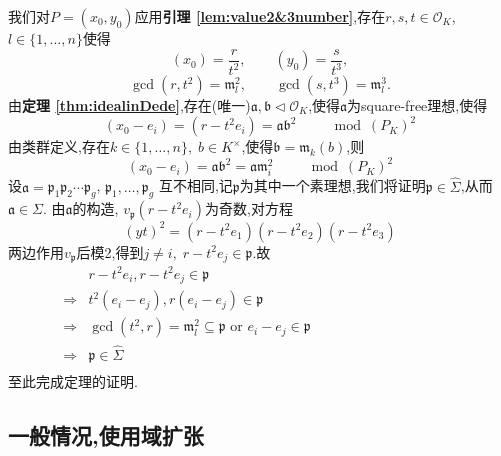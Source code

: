 \documentclass[12pt,A4paper,oneside,reqno]{amsart}
\numberwithin{equation}{section}
\theoremstyle{definition}
\theoremstyle{plain}
\theoremstyle{plain}
\numberwithin{equation}{section}
\theoremstyle{remark}
\begin{document}
我们对$P=(x_0,y_0)$应用\textbf{引理 \ref{lem:value2&3number}},存在$r,s,t \in \mathcal{O}_K$, $l \in \{1,\ldots,n\}$使得
$$(x_0)=\frac{r}{t^2}, \qquad (y_0)=\frac{s}{t^3}, $$
$$\gcd(r,t^2)=\mathfrak{m}_l^2, \qquad \gcd (s,t^3)=\mathfrak{m}_l^3.$$
由\textbf{定理 \ref{thm:idealinDede}},存在(唯一)$\mathfrak{a},\mathfrak{b} \vartriangleleft \mathcal{O}_K$,使得$\mathfrak{a}$为square-free理想,使得
$$(x_0-e_i)=(r-t^2e_i)=\mathfrak{a}\mathfrak{b}^2 \qquad \mod (P_K)^2$$
由类群定义,存在$k \in \{1,\ldots,n\},\; b \in K^{\times}$,使得$\mathfrak{b}=\mathfrak{m}_k(b)$,则
$$(x_0-e_i)=\mathfrak{a}\mathfrak{b}^2=\mathfrak{a}\mathfrak{m}_i^2 \qquad \mod (P_K)^2$$
设$\mathfrak{a}=\mathfrak{p}_1\mathfrak{p}_2\cdots \mathfrak{p}_g$, $\mathfrak{p}_1,\ldots ,\mathfrak{p}_g$ 互不相同,记$\mathfrak{p}$为其中一个素理想,我们将证明$\mathfrak{p} \in \hat{\Sigma}$,从而$\mathfrak{a} \in \Sigma$. 由$\mathfrak{a}$的构造, $v_{\mathfrak{p}}(r-t^2e_i)$为奇数,对方程
$$(yt)^2=(r-t^2e_1)(r-t^2e_2)(r-t^2e_3)$$
两边作用$v_{\mathfrak{p}}$后模2,得到$j \neq i,\; r-t^2e_j \in \mathfrak{p}$.故
\begin{equation*}
\begin{aligned}
& r-t^2e_i, r-t^2e_j \in \mathfrak{p}\\
\Longrightarrow& t^2(e_i-e_j),r(e_i-e_j) \in \mathfrak{p}\\
\Longrightarrow& \gcd (t^2,r)=\mathfrak{m}_l^2\subseteq\mathfrak{p} \text{ or } e_i-e_j \in \mathfrak{p}\\
\Longrightarrow&\mathfrak{p} \in \hat{\Sigma}\hspace{10cm}\\
\end{aligned}
\end{equation*}
至此完成定理的证明.
\subsection{一般情况,使用域扩张}\phantom{1}
\end{document}
